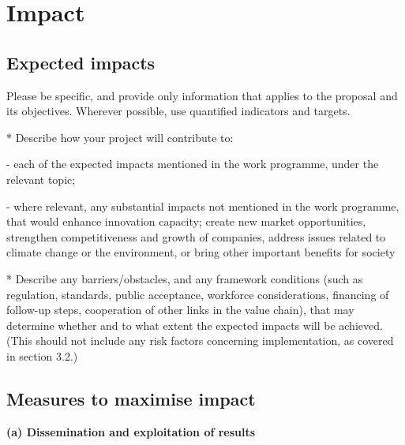 \chapter{Impact}\label{chap:impact}


\section{Expected impacts}\label{sec:expected-impact}

\begin{todo}{}\color{red}
  Please be specific, and provide only information that applies to the proposal and its objectives. Wherever possible, use quantified indicators and targets.
  
  * Describe how your project will contribute to:
  
      - each of the expected impacts mentioned in the work programme, under the relevant topic;
  
      - where relevant, any substantial impacts not mentioned in the work programme, that would enhance innovation capacity; create new market opportunities, strengthen competitiveness and growth of companies, address issues related to climate change or the environment, or  bring other important benefits for society
  
  * Describe any barriers/obstacles, and any framework conditions (such as regulation, standards, public acceptance, workforce considerations, financing of follow-up steps, cooperation of other links in the value chain), that may determine whether and to what extent the expected impacts will be achieved. (This should not include any risk factors concerning implementation, as covered in section 3.2.)
\end{todo}



\section{Measures to maximise impact}

{\bf (a) Dissemination and exploitation of results}

